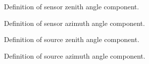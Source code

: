 \begin{figure}[htp]
  \centering
  
  \caption{Definition of \GeometryInfo{} sensor zenith angle component.}
  \label{fig:gInfo_sensor_zenith_angle}
\end{figure}

\begin{figure}[htp]
  \centering
  
  \caption{Definition of \GeometryInfo{} sensor azimuth angle component.}
  \label{fig:gInfo_sensor_azimuth_angle}
\end{figure}

\begin{figure}[htp]
  \centering
  
  \caption{Definition of \GeometryInfo{} source zenith angle component.}
  \label{fig:gInfo_source_zenith_angle}
\end{figure}

\begin{figure}[htp]
  \centering
  
  \caption{Definition of \GeometryInfo{} source azimuth angle component.}
  \label{fig:gInfo_source_azimuth_angle}
\end{figure}
